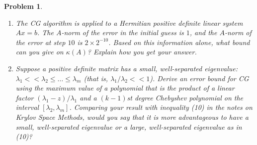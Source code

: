 \documentclass[12pt]{report}
\newtheorem{problem}{Problem}
\begin{document}
\newpage



\begin{problem}

    \noindent
    \begin{enumerate}
        \item
        The CG algorithm is applied to a Hermitian positive definite linear system $Ax=b$.
        The $A$-norm of the error in the initial guess is $1$, and the $A$-norm of the 
        error at step $10$ is $2 \times 2^{-10}$.  Based on this information alone, what
        bound can you give on $\kappa (A)$?  Explain how you get your answer.
        \item
        Suppose a positive definite matrix has a small, well-separated eigenvalue:
        $\lambda_1 << \lambda_2 \leq \ldots \leq \lambda_m$ (that is, $\lambda_1 / \lambda_2 << 1$).
        Derive an error bound for CG using the maximum value of a polynomial that is the
        product of a linear factor $( \lambda_1 - z)/ \lambda_1$ and a $(k-1)$st degree
        Chebyshev polynomial on the interval $[ \lambda_2 , \lambda_m ]$.  Comparing your
        result with inequality (10) in the notes on Krylov Space Methods, would you say that
        it is more advantageous to have a small, well-separated eigenvalue or a large,
        well-separated eigenvalue as in (10)?
    \end{enumerate}
\end{problem}
\end{document}
